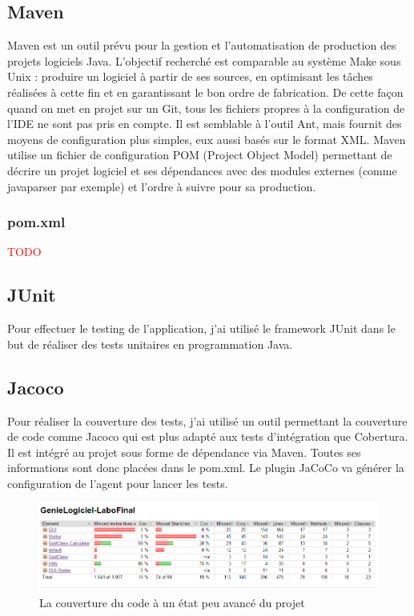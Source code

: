 \documentclass[a4paper, 11pt]{article}
\begin{document}
	\subsection{Maven}
		Maven est un outil prévu pour la gestion et l'automatisation de production des projets logiciels Java. L'objectif recherché est comparable au système Make sous Unix : produire un logiciel à partir de ses sources, en optimisant les tâches réalisées à cette fin et en garantissant le bon ordre de fabrication. De cette façon quand on met en projet sur un Git, tous les fichiers propres à la configuration de l'IDE ne sont pas pris en compte. Il est semblable à l'outil Ant, mais fournit des moyens de configuration plus simples, eux aussi basés sur le format XML. Maven utilise un fichier de configuration POM (Project Object Model) permettant de décrire un projet logiciel et ses dépendances avec des modules externes (comme javaparser par exemple) et l'ordre à suivre pour sa production.
		
		\subsubsection{pom.xml}
		\textcolor{red}{TODO}
	
	\subsection{JUnit}
		Pour effectuer le testing de l'application, j'ai utilisé le framework JUnit dans le but de réaliser des tests unitaires en programmation Java.
	
	\subsection{Jacoco}
		Pour réaliser la couverture des tests, j'ai utilisé un outil permettant la couverture de code comme Jacoco qui est plus adapté aux tests d'intégration que Cobertura. Il est intégré au projet sous forme de dépendance via Maven. Toutes ses informations sont donc placées dans le pom.xml. Le plugin JaCoCo va générer la configuration de l’agent pour lancer les tests.
		
	\begin{figure}[!h]
		\centering
		\includegraphics[scale=0.6]{Images/jacoco.png}
		\caption{La couverture du code à un état peu avancé du projet}
	\end{figure}
	
\end{document}

